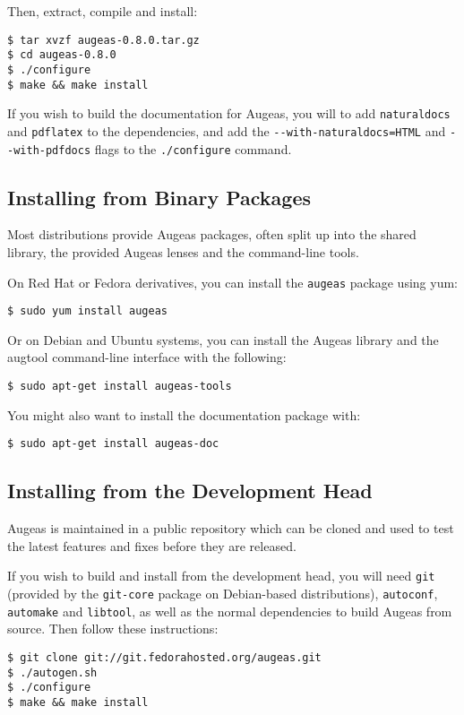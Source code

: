 Then, extract, compile and install:

\begin{verbatim}
$ tar xvzf augeas-0.8.0.tar.gz
$ cd augeas-0.8.0
$ ./configure
$ make && make install
\end{verbatim}

If you wish to build the documentation for Augeas, you will to add \verb!naturaldocs! and \verb!pdflatex! to the dependencies, and add the \verb!--with-naturaldocs=HTML! and \verb!--with-pdfdocs! flags to the \verb!./configure! command.

\subsection{Installing from Binary Packages}


Most distributions provide Augeas packages, often split up into the shared library, the provided Augeas lenses and the command-line tools.

On Red Hat or Fedora derivatives, you can install the \verb!augeas! package using yum:

\begin{verbatim}
$ sudo yum install augeas
\end{verbatim}

Or on Debian and Ubuntu systems, you can install the Augeas library and the augtool command-line interface with the following:

\begin{verbatim}
$ sudo apt-get install augeas-tools
\end{verbatim}

You might also want to install the documentation package with:

\begin{verbatim}
$ sudo apt-get install augeas-doc
\end{verbatim}

\subsection{Installing from the Development Head}


Augeas is maintained in a public repository which can be cloned and used to test the latest features and fixes before they are released.

If you wish to build and install from the development head, you will need \verb!git! (provided by the \verb!git-core! package on Debian-based distributions), \verb!autoconf!, \verb!automake! and \verb!libtool!, as well as the normal dependencies to build Augeas from source. Then follow these instructions:

\begin{verbatim}
$ git clone git://git.fedorahosted.org/augeas.git
$ ./autogen.sh
$ ./configure
$ make && make install
\end{verbatim}
